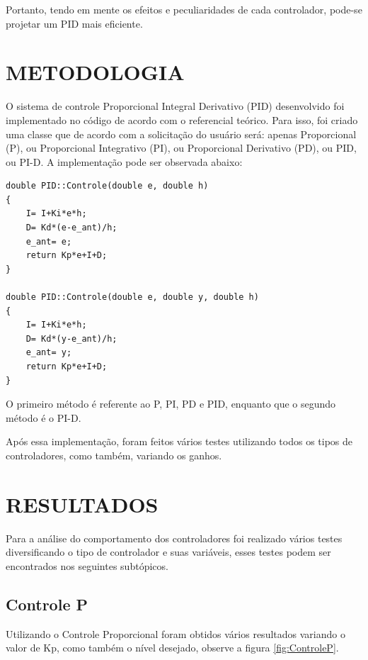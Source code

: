 \documentclass[a4paper,12pt]{article}
\begin{document}
Portanto, tendo em mente os efeitos e peculiaridades de cada controlador, pode-se projetar um PID mais eficiente.
\newpage


\thispagestyle{main}

\section{METODOLOGIA}

\hspace{4ex}O sistema de controle Proporcional Integral Derivativo (PID) desenvolvido foi implementado no código de acordo com o referencial teórico. Para isso, foi criado uma classe que de acordo com a solicitação do usuário será: apenas Proporcional (P), ou Proporcional Integrativo (PI), ou Proporcional Derivativo (PD), ou PID, ou PI-D. A implementação pode ser observada abaixo:

\begin{lstlisting}
double PID::Controle(double e, double h)
{
    I= I+Ki*e*h;
    D= Kd*(e-e_ant)/h;
    e_ant= e;
    return Kp*e+I+D;
}

double PID::Controle(double e, double y, double h)
{
    I= I+Ki*e*h;
    D= Kd*(y-e_ant)/h;
    e_ant= y;
    return Kp*e+I+D;
}
\end{lstlisting}

\hspace{4ex}O primeiro método é referente ao P, PI, PD e PID, enquanto que o segundo método é o PI-D.

\hspace{4ex}Após essa implementação, foram feitos vários testes utilizando todos os tipos de controladores, como também, variando os ganhos.

\newpage


\thispagestyle{main}

\section{RESULTADOS}

\hspace{4ex}Para a análise do comportamento dos controladores foi realizado vários testes diversificando o tipo de controlador e suas variáveis, esses testes podem ser encontrados nos seguintes subtópicos.

\subsection{Controle P}
\hspace{4ex}Utilizando o Controle Proporcional foram obtidos vários resultados variando o valor de Kp, como também o nível desejado, observe a figura \ref{fig:ControleP}.
\end{document}
